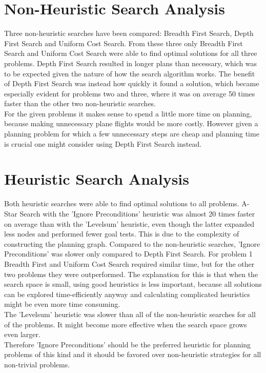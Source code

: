\documentclass{article}
\begin{document}
\section*{Non-Heuristic Search Analysis}
Three non-heuristic searches have been compared: Breadth First Search, Depth First
Search and Uniform Cost Search. From these three only Breadth First Search and Uniform
Cost Search were able to find optimal solutions for all three problems. Depth
First Search resulted in longer plans than necessary, which was to be expected given
the nature of how the search algorithm works. The benefit of Depth First Search
was instead how quickly it found a solution, which became especially evident for problems
two and three, where it was on average 50 times faster than the other two non-heuristic
searches. \\
For the given problems it makes sense to spend a little more time on planning,
because making unnecessary plane flights would be more costly. However given a planning
problem for which a few unnecessary steps are cheap and planning time is crucial
one might consider using Depth First Search instead.

\section*{Heuristic Search Analysis}
Both heuristic searches were able to find optimal solutions to all problems. A-Star
Search with the 'Ignore Preconditions' heuristic was almost 20 times faster on average
than with the 'Levelsum' heuristic, even though the latter expanded less nodes and
performed fewer goal tests. This is due to the complexity of constructing the planning
graph.
Compared to the non-heuristic searches, 'Ignore Preconditions' was slower only compared
to Depth First Search. For problem 1 Breadth First and Uniform Cost Search required
similar time, but for the other two problems they were outperformed. The explanation
for this is that when the search space is small, using good heuristics is less important, because
all solutions can be explored time-efficiently anyway and calculating complicated heuristics
might be even more time consuming. \\
The 'Levelsum' heuristic was slower than all of the non-heuristic searches for all
of the problems. It might become more effective when the search space grows even larger. \\
Therefore 'Ignore Preconditions' should be the preferred heuristic for planning
problems of this kind and it should be favored over non-heuristic strategies for
all non-trivial problems.
\end{document}
